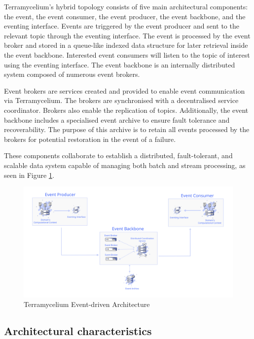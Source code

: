 \documentclass[review]{elsarticle}
\begin{document}
Terramycelium's hybrid topology consists of five main architectural components: the event, the event consumer, the event producer, the event backbone, and the eventing interface. Events are triggered by the event producer and sent to the relevant topic through the eventing interface. The event is processed by the event broker and stored in a queue-like indexed data structure for later retrieval inside the event backbone. Interested event consumers will listen to the topic of interest using the eventing interface. The event backbone is an internally distributed system composed of numerous event brokers. 

Event brokers are services created and provided to enable event communication via Terramycelium. The brokers are synchronised with a decentralised service coordinator. Brokers also enable the replication of topics. Additionally, the event backbone includes a specialised event archive to ensure fault tolerance and recoverability. The purpose of this archive is to retain all events processed by the brokers for potential restoration in the event of a failure. 

These components collaborate to establish a distributed, fault-tolerant, and scalable data system capable of managing both batch and stream processing, as seen in Figure \ref{fig:eventDrivenArchitecture}. 

\begin{figure}[ht]

  \centering

  \includegraphics[width=13cm]{images/Event-architecture.png}

  \caption{Terramycelium Event-driven Architecture}

  \label{fig:eventDrivenArchitecture}

\end{figure}

\subsection{Architectural characteristics}
\end{document}
